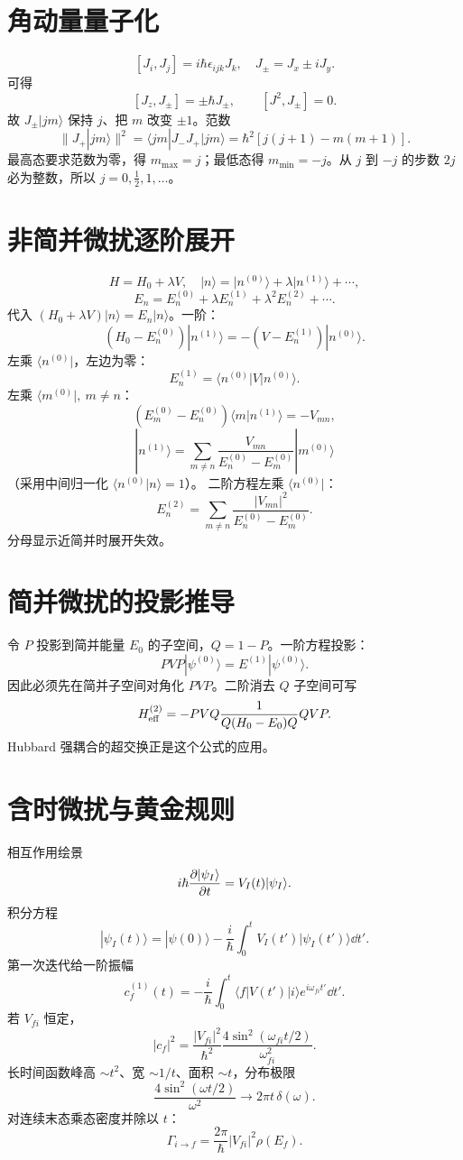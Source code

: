 \section{角动量量子化}
\[
[J_i,J_j]=i\hbar\epsilon_{ijk}J_k,\quad
J_\pm=J_x\pm iJ_y.
\]
可得
\[
[J_z,J_\pm]=\pm\hbar J_\pm,\qquad
[J^2,J_\pm]=0.
\]
故 $J_\pm|jm\rangle$ 保持 $j$、把 $m$ 改变 $\pm1$。范数
\[
\|J_+|jm\rangle\|^2
=\langle jm|J_-J_+|jm\rangle
=\hbar^2[j(j+1)-m(m+1)].
\]
最高态要求范数为零，得 $m_{\max}=j$；最低态得
$m_{\min}=-j$。从 $j$ 到 $-j$ 的步数 $2j$ 必为整数，所以
$j=0,\frac12,1,\ldots$。

\section{非简并微扰逐阶展开}
\[
H=H_0+\lambda V,\quad
|n\rangle=|n^{(0)}\rangle+\lambda|n^{(1)}\rangle+\cdots,
\]
\[
E_n=E_n^{(0)}+\lambda E_n^{(1)}
+\lambda^2E_n^{(2)}+\cdots.
\]
代入 $(H_0+\lambda V)|n\rangle=E_n|n\rangle$。一阶：
\[
(H_0-E_n^{(0)})|n^{(1)}\rangle
=-(V-E_n^{(1)})|n^{(0)}\rangle.
\]
左乘 $\langle n^{(0)}|$，左边为零：
\[
\boxed{E_n^{(1)}=\langle n^{(0)}|V|n^{(0)}\rangle}.
\]
左乘 $\langle m^{(0)}|,\ m\ne n$：
\[
(E_m^{(0)}-E_n^{(0)})
\langle m|n^{(1)}\rangle=-V_{mn},
\]
\[
|n^{(1)}\rangle=\sum_{m\ne n}
\frac{V_{mn}}{E_n^{(0)}-E_m^{(0)}}|m^{(0)}\rangle
\]
（采用中间归一化 $\langle n^{(0)}|n\rangle=1$）。
二阶方程左乘 $\langle n^{(0)}|$：
\[
\boxed{
E_n^{(2)}=\sum_{m\ne n}
\frac{|V_{mn}|^2}{E_n^{(0)}-E_m^{(0)}}}.
\]
分母显示近简并时展开失效。

\section{简并微扰的投影推导}
令 $P$ 投影到简并能量 $E_0$ 的子空间，$Q=1-P$。一阶方程投影：
\[
PVP|\psi^{(0)}\rangle
=E^{(1)}|\psi^{(0)}\rangle.
\]
因此必须先在简并子空间对角化 $PVP$。二阶消去 $Q$ 子空间可写
\[
H_{\rm eff}^{(2)}
=-PVQ\frac1{Q(H_0-E_0)Q}QVP.
\]
Hubbard 强耦合的超交换正是这个公式的应用。

\section{含时微扰与黄金规则}
相互作用绘景
\[
i\hbar\frac{\partial |\psi_I\rangle}{\partial t}=V_I(t)|\psi_I\rangle.
\]
积分方程
\[
|\psi_I(t)\rangle=|\psi(0)\rangle
-\frac{i}{\hbar}\int_0^tV_I(t')|\psi_I(t')\rangle\dd t'.
\]
第一次迭代给一阶振幅
\[
c_f^{(1)}(t)=-\frac{i}{\hbar}
\int_0^t\langle f|V(t')|i\rangle
e^{i\omega_{fi}t'}\dd t'.
\]
若 $V_{fi}$ 恒定，
\[
|c_f|^2=\frac{|V_{fi}|^2}{\hbar^2}
\frac{4\sin^2(\omega_{fi}t/2)}{\omega_{fi}^2}.
\]
长时间函数峰高 $\sim t^2$、宽 $\sim1/t$、面积 $\sim t$，分布极限
\[
\frac{4\sin^2(\omega t/2)}{\omega^2}
\longrightarrow2\pi t\,\delta(\omega).
\]
对连续末态乘态密度并除以 $t$：
\[
\boxed{\Gamma_{i\to f}
=\frac{2\pi}{\hbar}|V_{fi}|^2\rho(E_f)}.
\]

